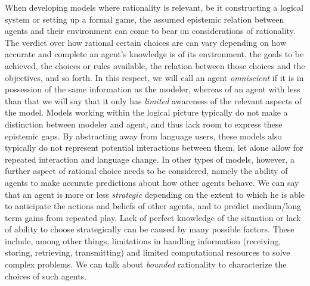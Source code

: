 \documentclass[a4paper]{article}
\begin{document}
When developing models where rationality is relevant, be it constructing a logical system or setting up a formal game, the assumed epistemic relation between agents and their environment can come to bear on considerations of rationality.
The verdict over how rational certain choices are can vary depending on how accurate and complete an agent's knowledge is of its environment, the goals to be achieved, the choices or rules available, the relation between those choices and the objectives, and so forth.
In this respect, we will call an agent \emph{omniscient} if it is in possession of the same information as the modeler, whereas of an agent with less than that we will say that it only has \emph{limited} awareness of the relevant aspects of the model.
Models working within the logical picture typically do not make a distinction between modeler and agent, and thus lack room to express these epistemic gaps.
By abstracting away from language users, these models also typically do not represent potential interactions between them, let alone allow for repeated interaction and language change.
In other types of models, however, a further aspect of rational choice needs to be considered, namely the ability of agents to make accurate predictions about how other agents behave.
We can say that an agent is more or less \emph{strategic} depending on the extent to which he is able to anticipate the actions and beliefs of other agents, and to predict medium/long term gains from repeated play.
Lack of perfect knowledge of the situation or lack of ability to choose strategically can be caused by many possible factors.
These include, among other things, limitations in handling information (receiving, storing, retrieving, transmitting) and limited computational resources to solve complex problems.
We can talk about \emph{bounded} rationality to characterize the choices of such agents.
%
\end{document}
